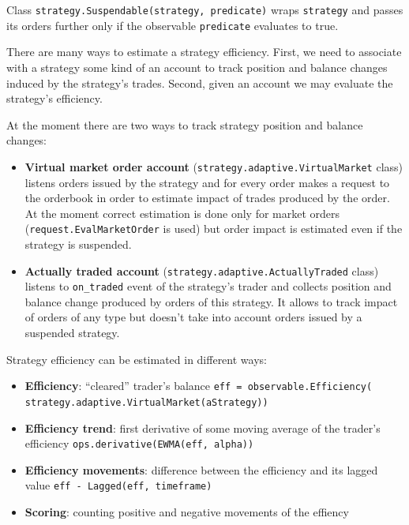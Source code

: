 \documentclass[a4paper,11pt]{article}
\begin{document}
Class \texttt{strategy.Suspendable(strategy, predicate)} wraps
\texttt{strategy} and passes its orders further only if the observable
\texttt{predicate} evaluates to true.

There are many ways to estimate a strategy efficiency. First, we need to
associate with a strategy some kind of an account to track position and
balance changes induced by the strategy's trades. Second, given an
account we may evaluate the strategy's efficiency.

At the moment there are two ways to track strategy position and balance
changes:

\begin{itemize}
\itemsep1pt\parskip0pt
\item
  \textbf{Virtual market order account}
  (\texttt{strategy.adaptive.VirtualMarket} class) listens orders issued
  by the strategy and for every order makes a request to the orderbook
  in order to estimate impact of trades produced by the order. At the
  moment correct estimation is done only for market orders
  (\texttt{request.EvalMarketOrder} is used) but order impact is
  estimated even if the strategy is suspended.
\item
  \textbf{Actually traded account}
  (\texttt{strategy.adaptive.ActuallyTraded} class) listens to
  \texttt{on\_traded} event of the strategy's trader and collects
  position and balance change produced by orders of this strategy. It
  allows to track impact of orders of any type but doesn't take into
  account orders issued by a suspended strategy.
\end{itemize}

Strategy efficiency can be estimated in different ways:

\begin{itemize}
\itemsep1pt\parskip0pt
\item
  \textbf{Efficiency}: ``cleared'' trader's balance
  \texttt{eff = observable.Efficiency(}
  \texttt{                    strategy.adaptive.VirtualMarket(aStrategy))}
\item
  \textbf{Efficiency trend}: first derivative of some moving average of
  the trader's efficiency \texttt{ops.derivative(EWMA(eff, alpha))}
\item
  \textbf{Efficiency movements}: difference between the efficiency and
  its lagged value \texttt{eff - Lagged(eff, timeframe)}
\item
  \textbf{Scoring}: counting positive and negative movements of the
  effiency
\end{itemize}
\end{document}
